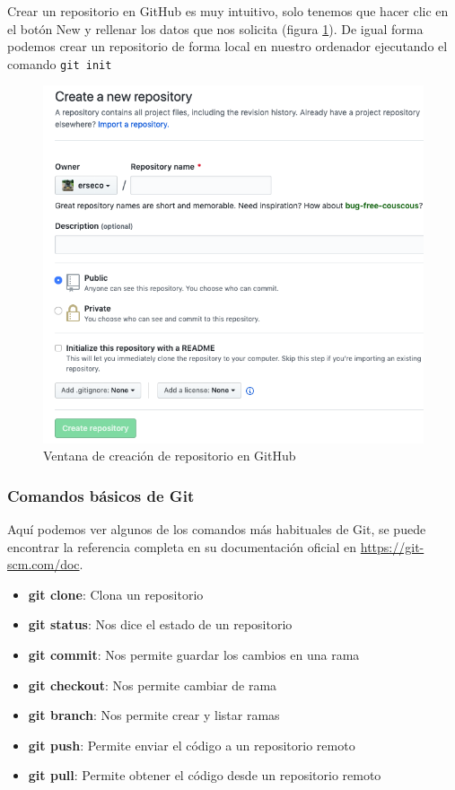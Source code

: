 Crear un repositorio en GitHub es muy intuitivo, solo tenemos que hacer clic en el botón New y rellenar los datos que nos solicita (figura \ref{fig:git2}). De igual forma podemos crear un repositorio de forma local en nuestro ordenador ejecutando el comando \texttt{git init}
\begin{figure}[h!]
\centering
\includegraphics[width=1.0\textwidth]{../images/git2}
\caption{Ventana de creación de repositorio en GitHub}
\label{fig:git2}
\end{figure}

\subsubsection{Comandos básicos de Git}

Aquí podemos ver algunos de los comandos más habituales de Git, se puede encontrar la referencia completa en su documentación oficial en \url{https://git-scm.com/doc}.

\begin{itemize}
  \item \textbf{git clone}: Clona un repositorio
  \item \textbf{git status}: Nos dice el estado de un repositorio
  \item \textbf{git commit}: Nos permite guardar los cambios en una rama
  \item \textbf{git checkout}: Nos permite cambiar de rama
  \item \textbf{git branch}: Nos permite crear y listar ramas
  \item \textbf{git push}: Permite enviar el código a un repositorio remoto
  \item \textbf{git pull}: Permite obtener el código desde un repositorio remoto
\end{itemize}


